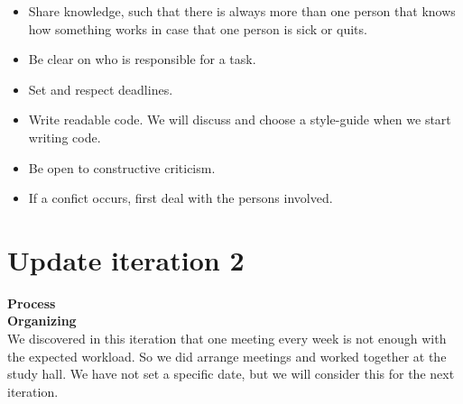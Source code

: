 \documentclass[norsk]{article}
\begin{document}
  \begin{itemize}
  	\item 
  	Share knowledge, such that there is always more than one person that knows how something works in case that one person is sick or quits.
  	\item 
  	Be clear on who is responsible for a task.
  	\item 
  	Set and respect deadlines.
  	\item 
  	Write readable code. We will discuss and choose a style-guide when we start writing code. 
  	\item 
  	Be open to constructive criticism.
  	\item
  	If a confict occurs, first deal with the persons involved. 
 \end{itemize}

\section{Update iteration 2}
\textbf{Process}\\



\textbf{Organizing}\\
We discovered in this iteration that one meeting every week is not enough with the expected workload. So we did arrange meetings and worked together at the study hall. We have not set a specific date, but we will consider this for the next iteration.


	
\end{document}
